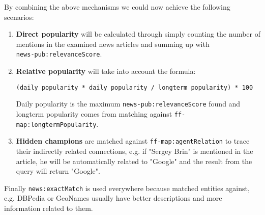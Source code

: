 By combining the above mechanisms we could now achieve the following scenarios:
\begin{enumerate}
    \item \textbf{Direct popularity} will be calculated through simply counting the number of mentions in the examined news articles and summing up with \\ \texttt{news-pub:relevanceScore}.
    \item \textbf{Relative popularity} will take into account the formula: 
\begin{verbatim}
(daily popularity * daily popularity / longterm popularity) * 100
\end{verbatim}
    Daily popularity is the maximum \texttt{news-pub:relevanceScore} found and longterm popularity comes from matching against \texttt{ff-map:longtermPopularity}.
    \item \textbf{Hidden champions} are matched against \texttt{ff-map:agentRelation} to trace their indirectly related connections, e.g. if "Sergey Brin" is mentioned in the article, he will be automatically related to "Google" and the result from the query will return "Google".
\end{enumerate}
Finally \texttt{news:exactMatch} is used everywhere because matched entities against, e.g. DBPedia or GeoNames usually have better descriptions and more information related to them.